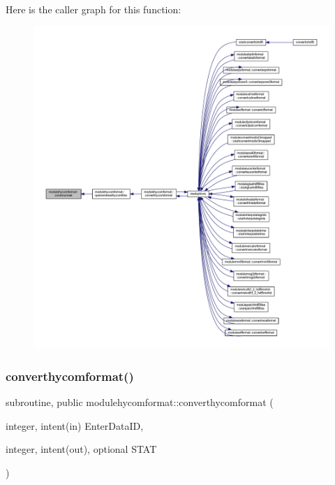 Here is the caller graph for this function\+:\nopagebreak
\begin{figure}[H]
\begin{center}
\leavevmode
\includegraphics[width=350pt]{namespacemodulehycomformat_aab97b75b8e514c72a0dbade3a8884e90_icgraph}
\end{center}
\end{figure}
\mbox{\label{namespacemodulehycomformat_a75ba9ace07164a1aac61c55e48af9959}} 
\subsubsection{\texorpdfstring{converthycomformat()}{converthycomformat()}}
{\footnotesize\ttfamily subroutine, public modulehycomformat\+::converthycomformat (\begin{DoxyParamCaption}\item[{integer, intent(in)}]{Enter\+Data\+ID,  }\item[{integer, intent(out), optional}]{S\+T\+AT }\end{DoxyParamCaption})}

